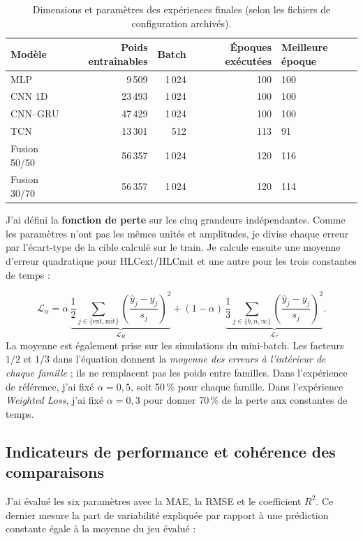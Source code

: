 \documentclass[10pt,a4paper]{article}
\begin{document}
\begin{table}[htbp]
\centering
\caption{Dimensions et paramètres des expériences finales (selon les fichiers de configuration archivés).}
\label{tab:hyper}
\small
\begin{tabular}{lrrrl}
\toprule
Modèle & Poids entraînables & Batch & Époques exécutées & Meilleure époque \\
\midrule
MLP             & 9\,509  & 1\,024 & 100 & 100 \\
CNN 1D          & 23\,493 & 1\,024 & 100 & 100 \\
CNN--GRU        & 47\,429 & 1\,024 & 100 & 100 \\
TCN             & 13\,301 & 512 & 113 & 91 \\
Fusion 50/50    & 56\,357 & 1\,024 & 120 & 116 \\
Fusion 30/70    & 56\,357 & 1\,024 & 120 & 114 \\
\bottomrule
\end{tabular}
\end{table}

J'ai défini la \textbf{fonction de perte} sur les cinq grandeurs indépendantes. Comme les paramètres n'ont pas les mêmes unités et amplitudes, je divise chaque erreur par l'écart-type de la cible calculé sur le train. Je calcule ensuite une moyenne d'erreur quadratique pour HLCext/HLCmit et une autre pour les trois constantes de temps :

\begin{equation}
\mathcal{L}_{\alpha}
=\alpha\,\underbrace{\frac12\sum_{j\in\{\mathrm{ext,mit}\}}
\left(\frac{\hat y_j-y_j}{s_j}\right)^2}_{\mathcal{L}_{H}}
+(1-\alpha)\,\underbrace{\frac13\sum_{j\in\{b,n,\infty\}}
\left(\frac{\hat y_j-y_j}{s_j}\right)^2}_{\mathcal{L}_{\tau}}.
\label{eq:loss}
\end{equation}
La moyenne est également prise sur les simulations du mini-batch. Les facteurs $1/2$ et $1/3$ dans l'équation donnent la \emph{moyenne des erreurs à l'intérieur de chaque famille} ; ils ne remplacent pas les poids entre familles. Dans l'expérience de référence, j'ai fixé $\alpha=0{,}5$, soit 50\,\% pour chaque famille. Dans l'expérience \emph{Weighted Loss}, j'ai fixé $\alpha=0{,}3$ pour donner 70\,\% de la perte aux constantes de temps.

\subsection{Indicateurs de performance et cohérence des comparaisons}
J'ai évalué les six paramètres avec la MAE, la RMSE et le coefficient $R^2$. Ce dernier mesure la part de variabilité expliquée par rapport à une prédiction constante égale à la moyenne du jeu évalué :
\end{document}
